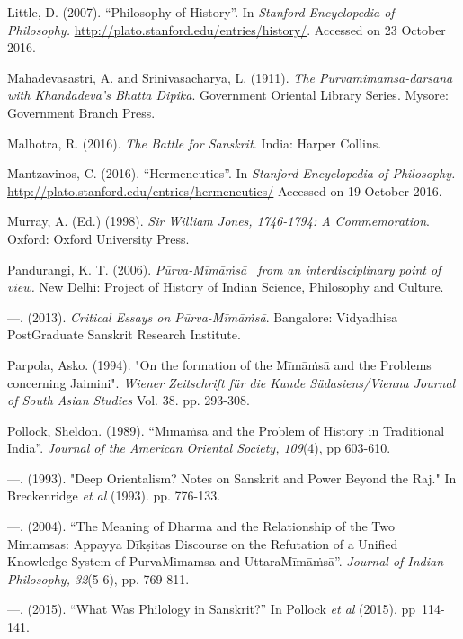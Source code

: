 \begin{thebibliography}{99}
  Little, D. (2007). “Philosophy of History”. In \textit{Stanford Encyclopedia of Philosophy.} \url{http://plato.stanford.edu/entries/history/}. Accessed on 23 October 2016.

  Mahadevasastri, A. and Srinivasacharya, L. (1911). \textit{The Purvamimamsa-darsana with Khandadeva's Bhatta Dipika}. Government Oriental Library Series. Mysore: Government Branch Press.

  Malhotra, R. (2016). \textit{The Battle for Sanskrit.} India: Harper Collins.

  Mantzavinos, C. (2016). “Hermeneutics”. In \textit{Stanford Encyclopedia of Philosophy.} \url{http://plato.stanford.edu/entries/hermeneutics/} Accessed on 19 October 2016.

  Murray, A. (Ed.) (1998). \textit{Sir William Jones, 1746-1794: A Commemoration}. Oxford: Oxford University Press.

  Pandurangi, K. T. (2006). \textit{Pūrva-Mīmāṁsā  from an interdisciplinary point of view.} New Delhi: Project of History of Indian Science, Philosophy and Culture.

  —. (2013). \textit{Critical Essays on Pūrva-Mīmāṁsā}. Bangalore: Vidyadhisa PostGraduate Sanskrit Research Institute.

  Parpola, Asko. (1994). "On the formation of the Mīmāṁsā and the Problems concerning Jaimini". \textit{Wiener Zeitschrift für die Kunde Südasiens/Vienna Journal of South Asian Studies} Vol. 38. pp. 293-308.

  Pollock, Sheldon. (1989). “Mīmāṁsā and the Problem of History in Traditional India”. \textit{Journal of the American Oriental Society, 109}(4), pp 603-610.

  —. (1993). "Deep Orientalism? Notes on Sanskrit and Power Beyond the Raj." In Breckenridge \textit{et al} (1993). pp. 776-133.

  —. (2004). “The Meaning of Dharma and the Relationship of the Two Mimamsas: Appayya Dīkṣitas Discourse on the Refutation of a Unified Knowledge System of PurvaMimamsa and UttaraMīmāṁsā”. \textit{Journal of Indian Philosophy, 32}(5-6), pp. 769-811.

  —. (2015). “What Was Philology in Sanskrit?” In Pollock \textit{et al} (2015). pp~114-141.


\end{thebibliography}
